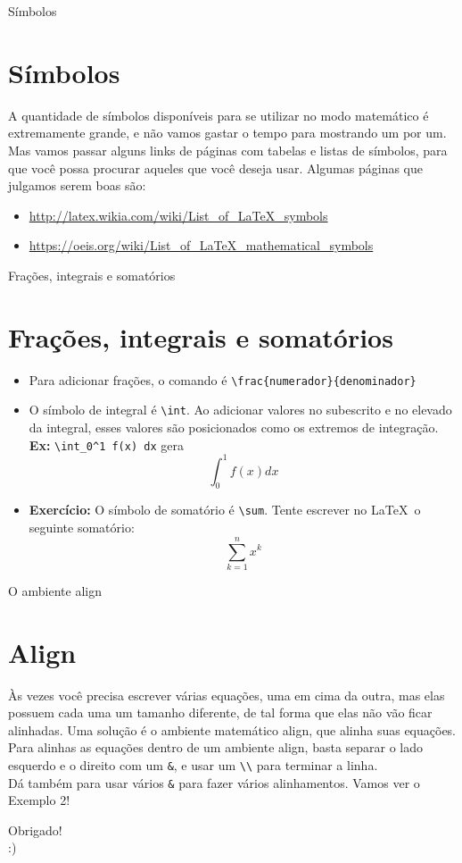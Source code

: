 \documentclass[12pt]{beamer}
\begin{document}
\begin{frame}{Símbolos}
  \section{Símbolos}

  A quantidade de símbolos disponíveis para se utilizar no modo matemático é extremamente grande, e não vamos gastar o tempo para mostrando um por um. Mas vamos passar alguns links de páginas com tabelas e listas de símbolos, para que você possa procurar aqueles que você deseja usar. Algumas páginas que julgamos serem boas são:

  \begin{itemize}
    \item \url{http://latex.wikia.com/wiki/List_of_LaTeX_symbols}
    \item \url{https://oeis.org/wiki/List_of_LaTeX_mathematical_symbols}
  \end{itemize}
\end{frame}

\begin{frame}[fragile]{Frações, integrais e somatórios}
  \section{Frações, integrais e somatórios}
  \begin{itemize}
    \item Para adicionar frações, o comando é \verb+\frac{numerador}{denominador}+
    \item O símbolo de integral é \verb+\int+. Ao adicionar valores no subescrito e no elevado da integral, esses valores são posicionados como os extremos de integração. \textbf{Ex:} \verb+\int_0^1 f(x) dx+ gera
    \[
    \int_{0}^1 f(x) dx
    \]
    \item \textbf{Exercício:} O símbolo de somatório é \verb+\sum+. Tente escrever no \LaTeX\ o seguinte somatório:
    \[
      \sum_{k=1}^n x^k
    \]
  \end{itemize}
\end{frame}

\begin{frame}[fragile]{O ambiente align}
  \section{Align}
  Às vezes você precisa escrever várias equações, uma em cima da outra, mas elas possuem cada uma um tamanho diferente, de tal forma que elas não vão ficar alinhadas. Uma solução é o ambiente matemático align, que alinha suas equações.
  \\[5px]

  Para alinhas as equações dentro de um ambiente align, basta separar o lado esquerdo e o direito com um \verb+&+, e usar um \verb+\\+ para terminar a linha.
  \\[5px]

  Dá também para usar vários \verb+&+ para fazer vários alinhamentos. Vamos ver o Exemplo 2!
\end{frame}

\begin{frame}
  \begin{center}
    \large Obrigado!\\
    :)
  \end{center}
\end{frame}
\end{document}
